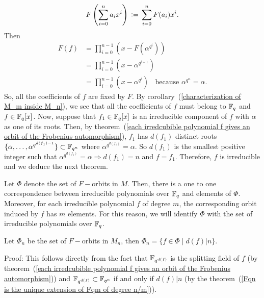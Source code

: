 \begin{equation}
    F\left(\sum_{i=0}^na_ix^i\right)\bydef \sum_{i=0}^nF(a_i)x^i.
\end{equation}
Then
\begin{equation}
\begin{split}
     F(f)&=\prod_{i=0}^{n-1}(x-F(\alpha^{q^i}))\\
     &=\prod_{i=0}^{n-1}(x-\alpha^{q^{i+1}})\\
     &=\prod_{i=0}^{n-1}(x-\alpha^{q^{i}})\;\;\text{ because }\alpha^{q^n}=\alpha.
\end{split}
\end{equation}
So, all the coefficients of $f$ are fixed by $F$. By corollary~(\ref{characterization of M_m inside M_n}), we see that all the coefficients of $f$ must belong to $\mathbb{F}_q$ and $f\in\mathbb{F}_q[x]$. Now, suppose that $f_1\in\mathbb{F}_q[x]$ is an irreducible component of $f$ with $\alpha$ as one of its roots. Then, by theorem~(\ref{each irredcubible polynomial f gives an orbit of the Frobenius automorphism}), $f_1$ has $d(f_1)$ distinct roots $\{\alpha,\dots,\alpha^{q^{d(f_1)-1}}\}\subset \mathbb{F}_{q^n}$ where $\alpha^{q^{d(f_1)}}=\alpha$. So $d(f_1)$ is the smallest positive integer such that $\alpha^{q^{d(f_1)}}=\alpha\Rightarrow d(f_1)=n$ and $f=f_1$. Therefore, $f$ is irreducible and we deduce the next theorem.
\begin{dang}
    \begin{theorem}
        Let $\Phi$ denote the set of $F-$orbits in $M$. Then, there is a one to one correspondence between irreducible polynomials over $\mathbb{F}_q$ and elements of $\Phi$. Moreover, for each irreducible polynomial $f$ of degree $m$, the corresponding orbit induced by $f$ has $m$ elements. For this reason, we will identify $\Phi$ with the set of irreducible polynomials over $\mathbb{F}_q$.
    \end{theorem}
\end{dang}
\begin{dang}
    \begin{corollary}\cite{macdonald1998symmetric}
        Let $\Phi_n$ be the set of $F-$orbits in $M_n$, then $\Phi_n=\{f\in\Phi\;|\;d(f)|n\}$.
    \end{corollary}
\end{dang}
Proof: This follows directly from the fact that $\mathbb{F}_{q^{d(f)}}$ is the splitting field of $f$ (by theorem~(\ref{each irredcubible polynomial f gives an orbit of the Frobenius automorphism})) and $\mathbb{F}_{q^{d(f)}}\subset\mathbb{F}_{q^n}$ if and only if $d(f)|n$ (by the theorem~(\ref{Fqn is the unique extension of Fqm of degree n/m})).

